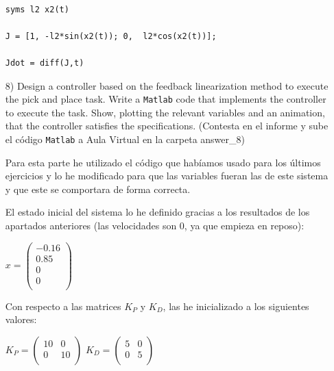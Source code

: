 \documentclass[a4paper]{article}
\begin{document}
\begin{itemize}
\bigskip

\begin{tcolorbox}[width=12cm, title={File \texttt{answer\_7.m}}]
\begin{scriptsize}
\begin{verbatim}

syms l2 x2(t)

J = [1, -l2*sin(x2(t)); 0,  l2*cos(x2(t))];

Jdot = diff(J,t)

\end{verbatim}
\end{scriptsize}
\end{tcolorbox}


\item[8)]  {\color{gray} Design a controller based on the feedback linearization method to execute the pick and place task. Write a \texttt{Matlab} code that implements the controller to execute the task. Show, plotting the relevant variables and an animation, that the controller satisfies the specifications. (Contesta en el informe y sube el c\'odigo \texttt{Matlab} a Aula Virtual en la carpeta answer\_8)}

\bigskip

Para esta parte he utilizado el código que habíamos usado para los últimos ejercicios y lo he modificado para que las variables fueran las de este sistema y que este se comportara de forma correcta.

El estado inicial del sistema lo he definido gracias a los resultados de los apartados anteriores (las velocidades son 0, ya que empieza en reposo):

\begin{center}
	$x = \begin{pmatrix}
		-0.16\\       
		0.85\\
		0\\
		0\\       
	\end{pmatrix}$
\end{center}

Con respecto a las matrices $K_{P}$ y $K_{D}$, las he inicializado a los siguientes valores: 

\begin{center}
	$K_{P} = \begin{pmatrix}
		10 & 0\\       
		0 & 10\\      
	\end{pmatrix}$
	$K_{D} = \begin{pmatrix}
		5 & 0\\       
		0 & 5\\      
	\end{pmatrix}$
\end{center}


\end{itemize}
\end{document}
